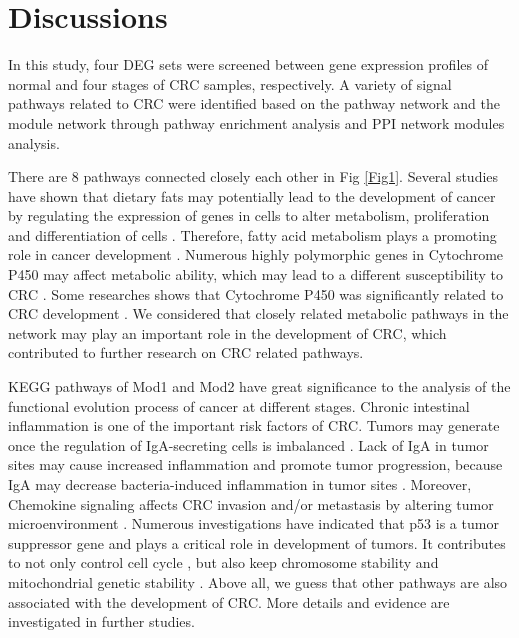 \documentclass[conference]{IEEEtran}
\begin{document}
\section{Discussions} 

In this study, four DEG sets were screened between gene expression profiles of normal and four stages of CRC samples, respectively. A variety of signal pathways related to CRC were identified based on the pathway network and the module network through pathway enrichment analysis and PPI network modules analysis.

There are 8 pathways connected closely each other in Fig \ref{Fig1}. Several studies have shown that dietary fats may potentially lead to the development of cancer by regulating the expression of genes in cells to alter metabolism, proliferation and differentiation of cells \cite{jump1999regulation}. Therefore, fatty acid metabolism plays a promoting role in cancer development \cite{hoeft2009polymorphisms}. Numerous highly polymorphic genes in Cytochrome P450 may affect metabolic ability, which may lead to a different susceptibility to CRC \cite{kury2007combinations}. Some researches shows that Cytochrome P450 was significantly related to CRC development \cite{ozhan2014genetic}. We considered that closely related metabolic pathways in the network may play an important role in the development of CRC, which contributed to further research on CRC related pathways.

KEGG pathways of Mod1 and Mod2 have great signiﬁcance to the analysis of the functional evolution process of cancer at different stages. Chronic intestinal inflammation is one of the important risk factors of CRC. Tumors may generate once the regulation of IgA-secreting cells is imbalanced \cite{wang2019function}. Lack of IgA in tumor sites may cause increased inflammation and promote tumor progression, because IgA may decrease bacteria-induced inflammation in tumor sites \cite{le2008high,tosolini2011clinical}. Moreover, Chemokine signaling affects CRC invasion and/or metastasis by altering tumor microenvironment \cite{itatani2016role}. Numerous investigations have indicated that p53 is a tumor suppressor gene \cite{suzuki2011recent} and plays a critical role in development of tumors. It contributes to not only control cell cycle \cite{suzuki2011recent}, but also keep chromosome stability \cite{achanta2005novel} and mitochondrial genetic stability \cite{liu2004chromosome,iglesias2012maintenance}. Above all, we guess that other pathways are also associated with the development of CRC. More details and evidence are investigated in further studies. 
\end{document}
